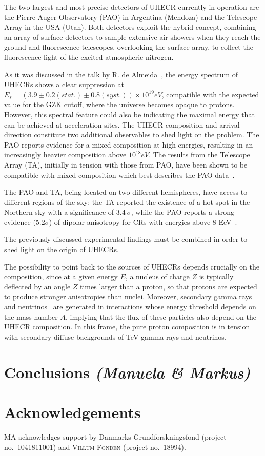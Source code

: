 \documentclass{PoS}
\begin{document}
\begin{itemize}
The two largest and most precise detectors of UHECR currently in operation are the
Pierre Auger Observatory (PAO) in Argentina (Mendoza) and the Telescope Array in the
USA (Utah). Both detectors exploit the hybrid concept, combining an array of
surface detectors to sample extensive air showers when they reach the ground and
fluorescence telescopes, overlooking the surface array, to collect the fluorescence light of the
excited atmospheric nitrogen. 




As it was discussed in the talk by R. de Almeida~\cite{Rogerio}, the energy spectrum of UHECRs shows a clear suppression at $E_{s} = (3.9 \pm 0.2(stat.) \pm
0.8(syst.)) \times 10^{19} eV$, compatible with the expected value for the GZK cutoff, where the universe becomes opaque to protons. However, this spectral feature could also be indicating the maximal energy that can be achieved at acceleration sites. 
The UHECR composition and arrival direction constitute two additional observables to shed light on the problem. The PAO reports evidence for a mixed composition at high energies, resulting in an increasingly heavier composition above $10^{18} eV$. The results from the Telescope Array (TA), initially in tension with those from PAO, have been shown to be compatible with mixed composition which best describes the PAO data~\cite{vitor}. 

The PAO and TA, being located on two different hemispheres, have access to different regions of the sky: the TA reported the existence of a hot spot in the Northern sky with a significance of $3.4~\sigma$, while the PAO reports 
a strong evidence (5.2$\sigma$) of dipolar anisotropy for CRs with energies above 8 EeV~\cite{Aab:2017tyv}. 


The previously discussed experimental findings must be combined in order to shed light on the origin of UHECRs. 

The possibility to point back to the sources of UHECRs depends crucially on the composition, since  
at a given energy $E$, a nucleus of charge $Z$ is typically deflected by an angle $Z$ times larger than a proton, so that protons are expected to produce stronger anisotropies than nuclei. 
Moreover, secondary gamma rays and neutrinos~\cite{AlvesBatista} are generated in 
interactions whose energy threshold depends on the mass number $A$, implying that the flux of these particles also depend on the UHECR composition. In this frame, the pure proton composition is in tension with secondary diffuse backgrounds of TeV gamma rays and neutrinos. 



\end{itemize}

\section{Conclusions {\it (Manuela \& Markus)}}


\section*{Acknowledgements}
MA acknowledges support by Danmarks Grundforskningsfond (project no.~1041811001) and \textsc{Villum Fonden} (project no.~18994).



\end{document}
